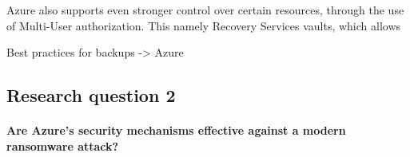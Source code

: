 Azure also supports even stronger control over certain resources, through the use of Multi-User authorization. This namely Recovery Services vaults, which allows 

Best practices for backups
 -> Azure



\subsection{Research question 2}
\paragraph{Are Azure's security mechanisms effective against a modern ransomware attack?}
